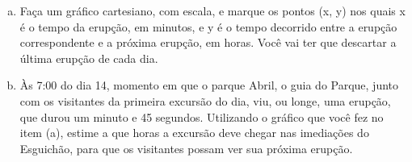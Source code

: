 \documentclass[a4paper,14pt]{article}
\begin{document}
	\begin{enumerate}[a)]
	\item Faça um gráfico cartesiano, com escala, e marque os pontos (x, y) nos quais x é o tempo da erupção, em minutos, e y é o tempo decorrido entre a erupção correspondente e a próxima erupção, em horas. Você vai ter que descartar a última erupção de cada dia.
	
	
	
	\item Às 7:00 do dia 14, momento em que o parque Abril, o guia do Parque, junto com os visitantes da primeira excursão do dia, viu, ou longe, uma erupção, que durou um minuto e 45 segundos. Utilizando o gráfico que você fez no item (a), estime a que horas a excursão deve chegar nas imediações do Esguichão, para que os visitantes possam ver sua próxima erupção.
	\end{enumerate}
\end{document}
